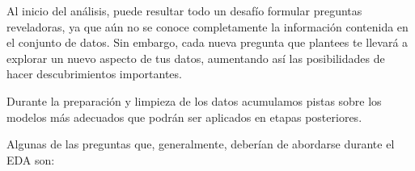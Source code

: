 \documentclass[
  letterpaper,
  DIV=11,
  numbers=noendperiod]{scrreprt}
\begin{document}
Al inicio del análisis, puede resultar todo un desafío formular
preguntas reveladoras, ya que aún no se conoce completamente la
información contenida en el conjunto de datos. Sin embargo, cada nueva
pregunta que plantees te llevará a explorar un nuevo aspecto de tus
datos, aumentando así las posibilidades de hacer descubrimientos
importantes.

\begin{tcolorbox}[enhanced jigsaw, arc=.35mm, breakable, coltitle=black, left=2mm, opacityback=0, bottomtitle=1mm, colbacktitle=quarto-callout-important-color!10!white, title=\textcolor{quarto-callout-important-color}{\faExclamation}\hspace{0.5em}{Para recordar}, titlerule=0mm, colback=white, colframe=quarto-callout-important-color-frame, bottomrule=.15mm, rightrule=.15mm, opacitybacktitle=0.6, toptitle=1mm, toprule=.15mm, leftrule=.75mm]

Durante la preparación y limpieza de los datos acumulamos pistas sobre
los modelos más adecuados que podrán ser aplicados en etapas
posteriores.

\end{tcolorbox}

Algunas de las preguntas que, generalmente, deberían de abordarse
durante el EDA son:
\end{document}

